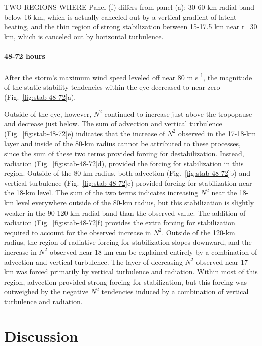 \documentclass{ametsoc}
\begin{document}
TWO REGIONS WHERE Panel (f) differs from panel (a): 30-60 km radial band below 16 km, which is actually canceled out by a vertical gradient of latent heating, and the thin region of strong stabilization between 15-17.5 km near r=30 km, which is canceled out by horizontal turbulence.

\paragraph{48-72 hours}
After the storm's maximum wind speed leveled off near 80 m s\textsuperscript{-1}, the magnitude of the static stability tendencies within the eye decreased to near zero (Fig.~\ref{fig:stab-48-72}a).

Outside of the eye, however, $N^2$ continued to increase just above the tropopause and decrease just below.
The sum of advection and vertical turbulence (Fig.~\ref{fig:stab-48-72}e) indicates that the increase of $N^2$ observed in the 17-18-km layer and inside of the 80-km radius cannot be attributed to these processes, since the sum of these two terms provided forcing for destabilization.
Instead, radiation (Fig.~\ref{fig:stab-48-72}d), provided the forcing for stabilization in this region.
Outside of the 80-km radius, both advection (Fig.~\ref{fig:stab-48-72}b) and vertical turbulence (Fig.~\ref{fig:stab-48-72}c) provided forcing for stabilization near the 18-km level.
The sum of the two terms indicates increasing $N^2$ near the 18-km level everywhere outside of the 80-km radius, but this stabilization is slightly weaker in the 90-120-km radial band than the observed value.
The addition of radiation (Fig.~\ref{fig:stab-48-72}f) provides the extra forcing for stabilization required to account for the observed increase in $N^2$.
Outside of the 120-km radius, the region of radiative forcing for stabilization slopes downward, and the increase in $N^2$ observed near 18 km can be explained entirely by a combination of advection and vertical turbulence.
The layer of decreasing $N^2$ observed near 17 km was forced primarily by vertical turbulence and radiation.
Within most of this region, advection provided strong forcing for stabilization, but this forcing was outweighed by the negative $N^2$ tendencies induced by a combination of vertical turbulence and radiation.

  \section{Discussion}
\end{document}
